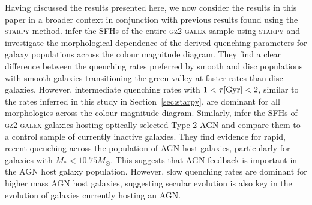 \documentclass[useAMS,usenatbib]{mn2e}
\begin{document}
Having discussed the results presented here, we now consider the results in this paper in a broader context in conjunction with previous results found using the \textsc{starpy} method. \cite{smethurst15} infer the SFHs of the entire \textsc{gz2-galex} sample using \textsc{starpy} and investigate the morphological dependence of the derived quenching parameters for galaxy populations across the colour magnitude diagram. They find a clear difference between the quenching rates preferred by smooth and disc populations with smooth galaxies transitioning the green valley at faster rates than disc galaxies. However, intermediate quenching rates with $1 < \tau \rm{[Gyr]} < 2$, similar to the rates inferred in this study in Section~\ref{sec:starpy}, are dominant for all morphologies across the colour-magnitude diagram. Similarly, \cite{smethurst16} infer the SFHs of \textsc{gz2-galex} galaxies hosting optically selected Type 2 AGN and compare them to a control sample of currently inactive galaxies. They find evidence for rapid, recent quenching across the population of AGN host galaxies, particularly for galaxies with $M_* < 10.75 M_{\odot}$. This suggests that AGN feedback is important in the AGN host galaxy population. However, slow quenching rates are dominant for higher mass AGN host galaxies, suggesting secular evolution is also key in the evolution of galaxies currently hosting an AGN.  


\end{document}
